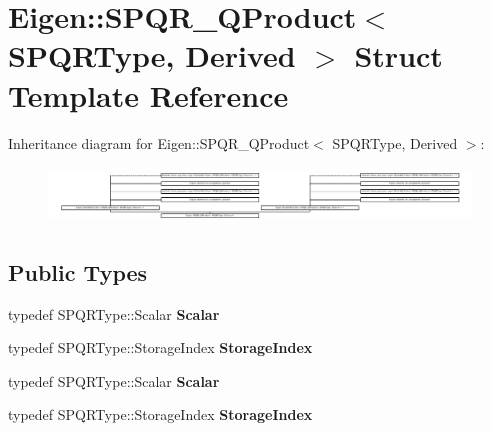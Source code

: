\hypertarget{struct_eigen_1_1_s_p_q_r___q_product}{}\section{Eigen\+:\+:S\+P\+Q\+R\+\_\+\+Q\+Product$<$ S\+P\+Q\+R\+Type, Derived $>$ Struct Template Reference}
\label{struct_eigen_1_1_s_p_q_r___q_product}
Inheritance diagram for Eigen\+:\+:S\+P\+Q\+R\+\_\+\+Q\+Product$<$ S\+P\+Q\+R\+Type, Derived $>$\+:\begin{figure}[H]
\begin{center}
\leavevmode
\includegraphics[height=1.502683cm]{struct_eigen_1_1_s_p_q_r___q_product}
\end{center}
\end{figure}
\subsection*{Public Types}
\begin{DoxyCompactItemize}
\item 
\mbox{\label{struct_eigen_1_1_s_p_q_r___q_product_a4856a2c3cc678f49f05d9eed34065ec6}} 
typedef S\+P\+Q\+R\+Type\+::\+Scalar {\bfseries Scalar}
\item 
\mbox{\label{struct_eigen_1_1_s_p_q_r___q_product_ab2b93e9c252b5692891b210886263d03}} 
typedef S\+P\+Q\+R\+Type\+::\+Storage\+Index {\bfseries Storage\+Index}
\item 
\mbox{\label{struct_eigen_1_1_s_p_q_r___q_product_a4856a2c3cc678f49f05d9eed34065ec6}} 
typedef S\+P\+Q\+R\+Type\+::\+Scalar {\bfseries Scalar}
\item 
\mbox{\label{struct_eigen_1_1_s_p_q_r___q_product_ab2b93e9c252b5692891b210886263d03}} 
typedef S\+P\+Q\+R\+Type\+::\+Storage\+Index {\bfseries Storage\+Index}
\end{DoxyCompactItemize}
